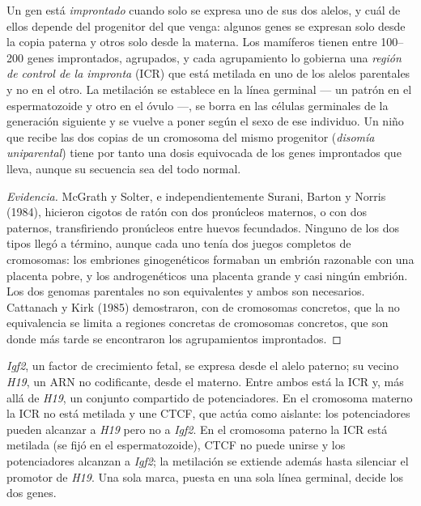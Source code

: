 \begin{definition}\label{def:b3:chromatin-epigenetics:imprinting}
Un gen está \emph{improntado} cuando solo se expresa uno de sus dos
alelos, y cuál de ellos depende del progenitor del que venga: algunos
genes se expresan solo desde la copia paterna y otros solo desde la
materna. Los mamíferos tienen entre \numrange{100}{200} genes
improntados, agrupados, y cada agrupamiento lo gobierna una \emph{región
de control de la impronta} (ICR) que está metilada en uno de los alelos
parentales y no en el otro. La metilación se establece en la línea
germinal --- un patrón en el espermatozoide y otro en el óvulo ---, se
borra en las células germinales de la generación siguiente y se vuelve a
poner según el sexo de ese individuo. Un niño que recibe las dos copias
de un cromosoma del mismo progenitor (\emph{disomía uniparental}) tiene
por tanto una dosis equivocada de los genes improntados que lleva, aunque
su secuencia sea del todo normal.
\end{definition}

\begin{proof}[Evidencia]
McGrath y Solter, e independientemente Surani, Barton y Norris (1984),
hicieron cigotos de ratón con dos pronúcleos maternos, o con dos
paternos, transfiriendo pronúcleos entre huevos fecundados. Ninguno de
los dos tipos llegó a término, aunque cada uno tenía dos juegos completos
de cromosomas: los embriones ginogenéticos formaban un embrión razonable
con una placenta pobre, y los androgenéticos una placenta grande y casi
ningún embrión. Los dos genomas parentales no son equivalentes y ambos
son necesarios. Cattanach y Kirk (1985) demostraron, con  de cromosomas concretos, que la no equivalencia se limita a
regiones concretas de cromosomas concretos, que son donde más tarde se
encontraron los agrupamientos improntados.
\end{proof}

\begin{example}\label{ex:b3:chromatin-epigenetics:igf2}
\emph{Igf2}, un factor de crecimiento fetal, se expresa desde el alelo
paterno; su vecino \emph{H19}, un ARN no codificante, desde el materno.
Entre ambos está la ICR y, más allá de \emph{H19}, un conjunto compartido
de potenciadores. En el cromosoma materno la ICR no está metilada y une
CTCF, que actúa como aislante: los potenciadores pueden alcanzar a
\emph{H19} pero no a \emph{Igf2}. En el cromosoma paterno la ICR está
metilada (se fijó en el espermatozoide), CTCF no puede unirse y los
potenciadores alcanzan a \emph{Igf2}; la metilación se extiende además
hasta silenciar el promotor de \emph{H19}. Una sola marca, puesta en una
sola línea germinal, decide los dos genes.
\end{example}

